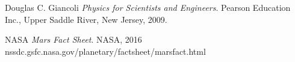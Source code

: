 \documentclass[11pt]{article}
\begin{document}
\begin{thebibliography}{99}

Douglas C. Giancoli
\textit{Physics for Scientists and Engineers}. 
Pearson Education Inc., Upper Saddle River, New Jersey, 2009.

NASA
\textit{Mars Fact Sheet}. 
NASA, 2016
nssdc.gsfc.nasa.gov/planetary/factsheet/marsfact.html

\end{thebibliography}
\end{document}
